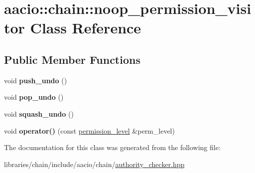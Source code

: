 \hypertarget{classaacio_1_1chain_1_1noop__permission__visitor}{}\section{aacio\+:\+:chain\+:\+:noop\+\_\+permission\+\_\+visitor Class Reference}
\label{classaacio_1_1chain_1_1noop__permission__visitor}
\subsection*{Public Member Functions}
\begin{DoxyCompactItemize}
\item 
\mbox{\label{classaacio_1_1chain_1_1noop__permission__visitor_a0b6fd9e417bae1c9af2ab9865c537cf8}} 
void {\bfseries push\+\_\+undo} ()
\item 
\mbox{\label{classaacio_1_1chain_1_1noop__permission__visitor_a37a4ca1f87a44060d3ba25fe257f82e5}} 
void {\bfseries pop\+\_\+undo} ()
\item 
\mbox{\label{classaacio_1_1chain_1_1noop__permission__visitor_a14b5ed97a2792440dc6ced4e66691b42}} 
void {\bfseries squash\+\_\+undo} ()
\item 
\mbox{\label{classaacio_1_1chain_1_1noop__permission__visitor_afde0b3700e1ccf7435e2beabc9edbd54}} 
void {\bfseries operator()} (const \mbox{\hyperlink{structaacio_1_1chain_1_1permission__level}{permission\+\_\+level}} \&perm\+\_\+level)
\end{DoxyCompactItemize}


The documentation for this class was generated from the following file\+:\begin{DoxyCompactItemize}
\item 
libraries/chain/include/aacio/chain/\mbox{\hyperlink{authority__checker_8hpp}{authority\+\_\+checker.\+hpp}}\end{DoxyCompactItemize}
